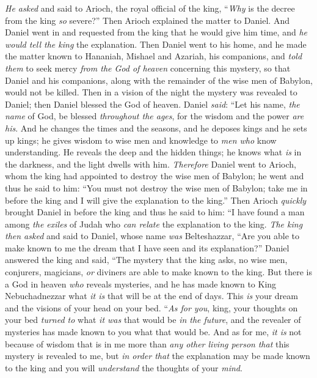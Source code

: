 \begin{biblechapter}
\verse \textit{He asked} and said to Arioch, the royal official of the king, “\textit{Why} is the decree from the king \textit{so} severe?” Then Arioch explained the matter to Daniel.
\verse And Daniel went in and requested from the king that he would give him time, and \textit{he would tell the king} the explanation.
\verse Then Daniel went to his home, and he made the matter known to Hananiah, Mishael and Azariah, his companions,
\verse and \textit{told them} to seek mercy \textit{from the God of heaven} concerning this mystery, so that Daniel and his companions, along with the remainder of the wise men of Babylon, would not be killed.
\verse Then in a vision of the night the mystery was revealed to Daniel; then Daniel blessed the God of heaven.
\verse Daniel \textit{said}:
\verse “Let his name, \textit{the name} of God, be blessed \textit{throughout the ages}, 
for the wisdom and the power \textit{are his}.
\verse And he changes the times and the seasons, 
and he deposes kings and he sets up kings; 
he gives wisdom to wise men 
and knowledge to \textit{men who} know understanding.
\verse He reveals the deep and the hidden things; 
he knows what \textit{is} in the darkness, 
and the light dwells with him.
 \textit{Therefore} Daniel went to Arioch, whom the king had appointed to destroy the wise men of Babylon; he went and thus he said to him: “You must not destroy the wise men of Babylon; take me in before the king and I will give the explanation to the king.”
\verse Then Arioch \textit{quickly} brought Daniel in before the king and thus he said to him: “I have found a man among \textit{the exiles} of Judah who \textit{can relate} the explanation to the king.
\verse \textit{The king then asked} and said to Daniel, whose name \textit{was} Belteshazzar, “Are you able to make known to me the dream that I have seen and its explanation?”
\verse Daniel answered the king and said, “The mystery that the king asks, no wise men, conjurers, magicians, \textit{or} diviners are able to make known to the king.
\verse But there is a God in heaven \textit{who} reveals mysteries, and he has made known to King Nebuchadnezzar what \textit{it is} that will be at the end of days. This \textit{is} your dream and the visions of your head on your bed.
\verse “\textit{As for you}, king, your thoughts on your bed \textit{turned to} what \textit{it was} that would be \textit{in the future}, and the revealer of mysteries has made known to you what that would be.
\verse And as for me, \textit{it is} not because of wisdom that is in me more than \textit{any other living person} \textit{that} this mystery is revealed to me, but \textit{in order that} the explanation may be made known to the king and you will \textit{understand} the thoughts of your \textit{mind}.

\end{biblechapter}
